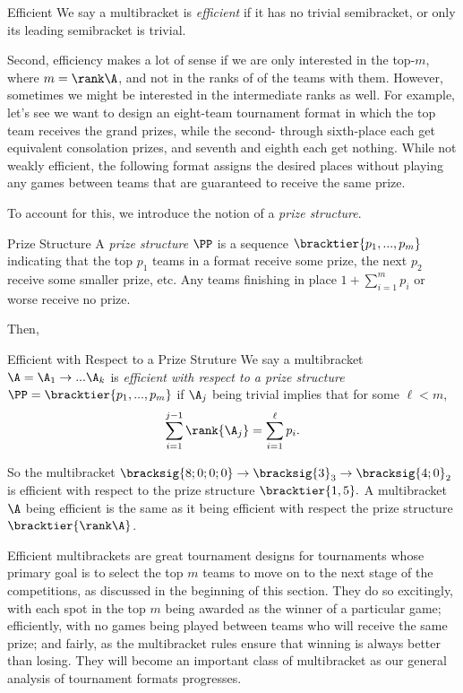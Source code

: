 {    \begin{definition}{Efficient}{}
        We say a multibracket is \textit{efficient} if it has no trivial semibracket, or only its leading semibracket is trivial.
    \end{definition}

    Second, efficiency makes a lot of sense if we are only interested in the top-$m$, where $m = \rank\A$, and not in the ranks of of the teams with them. However, sometimes we might be interested in the intermediate ranks as well. For example, let's see we want to design an eight-team tournament format in which the top team receives the grand prizes, while the second- through sixth-place each get equivalent consolation prizes, and seventh and eighth each get nothing. While not weakly efficient, the following format assigns the desired places without playing any games between teams that are guaranteed to receive the same prize.


    To account for this, we introduce the notion of a \textit{prize structure}.
    
    \begin{definition}{Prize Structure}{}
        A \textit{prize structure} $\PP$ is a sequence $\bracktier{p_1, ..., p_m}$ indicating that the top $p_1$ teams in a format receive some prize, the next $p_2$ receive some smaller prize, etc. Any teams finishing in place $1 + \sum_{i=1}^m p_i$ or worse receive no prize.
    \end{definition}

    Then,

    \begin{definition}{Efficient with Respect to a Prize Struture}{}
        We say a multibracket $\A = \A_1 \to ... \A_k$ is \textit{efficient with respect to a prize structure} $\PP = \bracktier{p_1, ..., p_m}$ if $\A_j$ being trivial implies that for some $\ell < m$, $$\sum_{i=1}^{j-1} \rank {\A_j} = \sum_{i=1}^\ell p_i.$$
    \end{definition}

    So the multibracket $\bracksig{8;0;0;0} \to \bracksig{3}_3 \to \bracksig{4;0}_2$ is efficient with respect to the prize structure $\bracktier{1, 5}.$ A multibracket $\A$ being efficient is the same as it being efficient with respect the prize structure $\bracktier{\rank\A}$.

    Efficient multibrackets are great tournament designs for tournaments whose primary goal is to select the top $m$ teams to move on to the next stage of the competitions, as discussed in the beginning of this section. They do so excitingly, with each spot in the top $m$ being awarded as the winner of a particular game; efficiently, with no games being played between teams who will receive the same prize; and fairly, as the multibracket rules ensure that winning is always better than losing. They will become an important class of multibracket as our general analysis of tournament formats progresses.
}